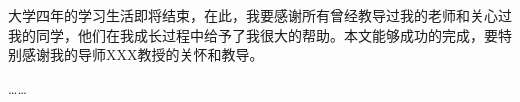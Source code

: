 \documentclass[supercite]{upcthesis}
\begin{document}
\fi

\begin{thankpage}
        大学四年的学习生活即将结束，在此，我要感谢所有曾经教导过我的老师和关心过我的同学，他们在我成长过程中给予了我很大的帮助。本文能够成功的完成，要特别感谢我的导师XXX教授的关怀和教导。

        ……
\end{thankpage}


\ifx\compileAllFiles\undefined
\end{document}
